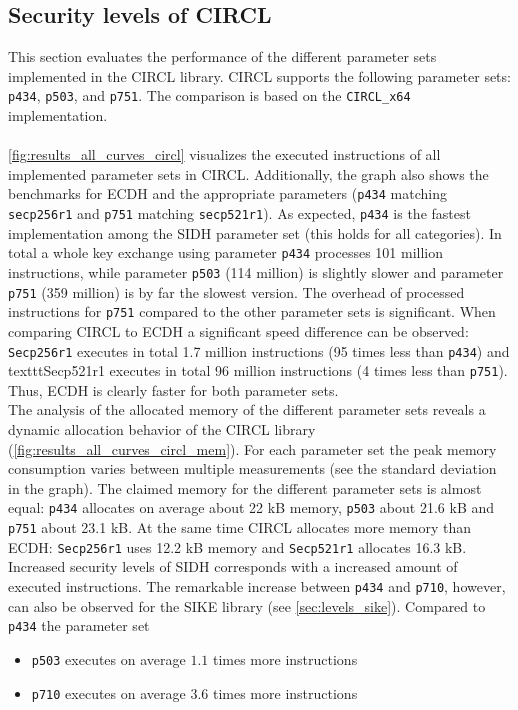 \subsection{Security levels of CIRCL}\label{sec:levels_circl}
This section evaluates the performance of the different parameter sets implemented in the \gls{CIRCL} library. \gls{CIRCL} supports the following parameter sets: \texttt{p434}, \texttt{p503}, and \texttt{p751}. The comparison is based on the \texttt{CIRCL\_x64} implementation.\\\\
\autoref{fig:results_all_curves_circl} visualizes the executed instructions of all implemented parameter sets in \gls{CIRCL}. Additionally, the graph also shows the benchmarks for ECDH and the appropriate parameters (\texttt{p434} matching \texttt{secp256r1} and \texttt{p751} matching \texttt{secp521r1}). As expected, \texttt{p434} is the fastest implementation among the \gls{SIDH} parameter set (this holds for all categories). In total a whole key exchange using parameter \texttt{p434} processes 101 million instructions, while parameter \texttt{p503} (114 million) is slightly slower and parameter \texttt{p751} (359 million) is by far the slowest version. The overhead of processed instructions for \texttt{p751} compared to the other parameter sets is significant.
When comparing \gls{CIRCL} to \gls{ECDH} a significant speed difference can be observed: \texttt{Secp256r1} executes in total 1.7 million instructions (95 times less than \texttt{p434}) and texttt{Secp521r1} executes in total 96 million instructions (4 times less than \texttt{p751}). Thus, \gls{ECDH} is clearly faster for both parameter sets.\\
The analysis of the allocated memory of the different parameter sets reveals a dynamic allocation behavior of the \gls{CIRCL} library (\autoref{fig:results_all_curves_circl_mem}). For each parameter set the peak memory consumption varies between multiple measurements (see the standard deviation in the graph). The claimed memory for the different parameter sets is almost equal: \texttt{p434} allocates on average about 22 \gls{kB} memory, \texttt{p503} about 21.6 \gls{kB} and \texttt{p751} about 23.1 \gls{kB}. At the same time \gls{CIRCL} allocates more memory than \gls{ECDH}: \texttt{Secp256r1} uses 12.2 \gls{kB} memory  and \texttt{Secp521r1} allocates 16.3 \gls{kB}.\\

Increased security levels of \gls{SIDH} corresponds with a increased amount of executed instructions. The remarkable increase between \texttt{p434} and \texttt{p710}, however, can also be observed for the \gls{SIKE} library (see \autoref{sec:levels_sike}). Compared to \texttt{p434} the parameter set
\begin{itemize}
\itemsep0em 
\item \texttt{p503} executes on average $1.1$ times more instructions
\item \texttt{p710} executes on average $3.6$ times more instructions
\end{itemize}

